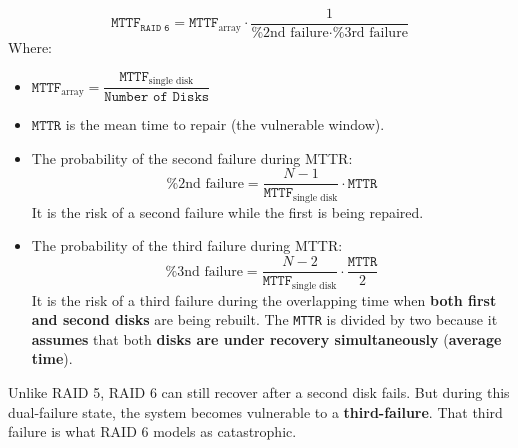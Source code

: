 \begin{itemize}
\begin{itemize}
        \begin{equation}
            \texttt{MTTF}_{\texttt{RAID 6}} = \texttt{MTTF}_{\text{array}} \cdot \dfrac{1}{
                \text{\% 2nd failure} \cdot \text{\% 3rd failure}
            }
        \end{equation}
        Where:
        \begin{itemize}
            \item $\texttt{MTTF}_{\text{array}} = \dfrac{\texttt{MTTF}_{\text{single disk}}}{\texttt{Number of Disks}}$
            \item $\texttt{MTTR}$ is the mean time to repair (the vulnerable window).
            \item The probability of the second failure during MTTR:
            \begin{equation}
                \text{\% 2nd failure} = \dfrac{N-1}{\texttt{MTTF}_{\text{single disk}}} \cdot \texttt{MTTR}
            \end{equation}
            It is the risk of a second failure while the first is being repaired.
            \item The probability of the third failure during MTTR:
            \begin{equation}
                \text{\% 3nd failure} = \dfrac{N-2}{\texttt{MTTF}_{\text{single disk}}} \cdot \dfrac{\texttt{MTTR}}{2}
            \end{equation}
            It is the risk of a third failure during the overlapping time when \textbf{both first and second disks} are being rebuilt. The \texttt{MTTR} is divided by two because it \textbf{assumes} that both \textbf{disks are under recovery simultaneously} (\textbf{average time}).
        \end{itemize}
        Unlike RAID 5, RAID 6 can still recover after a second disk fails. But during this dual-failure state, the system becomes vulnerable to a \textbf{third-failure}. That third failure is what RAID 6 models as catastrophic.
    \end{itemize}
\end{itemize}

\newpage

